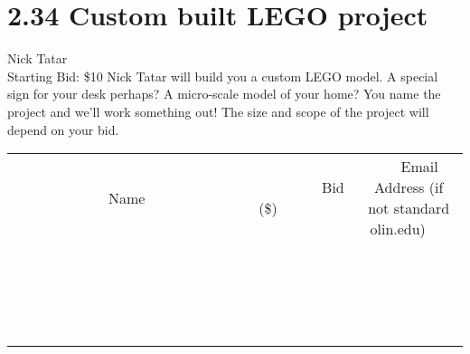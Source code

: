 \documentclass[11pt]{article}
\begin{document}
\section*{2.34 Custom built LEGO project}
Nick Tatar
\\
Starting Bid: \$10
\newline
Nick Tatar will build you a custom LEGO model. A special sign for your desk perhaps? A micro-scale model of your home? You name the project and we'll work something out! The size and scope of the project will depend on your bid.
\\[3ex]
\begin{tabular}{c c c}
~~~~~~~~~~~~~Name~~~~~~~~~~~~~ & ~~~~~~~~~Bid (\$)~~~~~~~~~  & ~~~Email Address (if not standard olin.edu)~~~\\
 & & \\
\hline
 & & \\
\hline
 & & \\
\hline
 & & \\
\hline
 & & \\
\hline
 & & \\
\hline
 & & \\
\hline
 & & \\
\hline
 & & \\
\hline
 & & \\
\hline
 & & \\
\hline
 & & \\
\hline
 & & \\
\hline
 & & \\
\hline
 & & \\
\hline
 & & \\
\hline
 & & \\
\hline
 & & \\
\hline
 & & \\
\hline
\end{tabular}
\newpage
\end{document}
